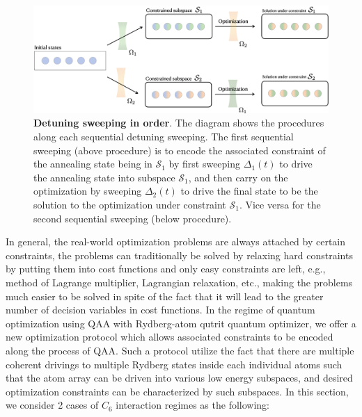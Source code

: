 \documentclass[%
 reprint,
nofootinbib,
 amsmath,amssymb,
 aps,
pra,
floatfix,
]{revtex4-2}
\begin{document}
\begin{figure}[b!]
    \centering
    \includegraphics[width=13cm]{picture/opti_procedure.png}
    \caption{\textbf{Detuning sweeping in order}.  The diagram shows the procedures along each sequential detuning sweeping. The first sequential sweeping (above procedure) is to encode the associated constraint of the annealing state being in $\mathcal{S}_1$ by first sweeping $\Delta_1(t)$ to drive the annealing state into subspace $\mathcal{S}_1$, and then carry on the optimization by sweeping $\Delta_2(t)$ to drive the final state to be the solution to the optimization under constraint $\mathcal{S}_1$. Vice versa for the second sequential sweeping (below procedure).}
    \label{fig:opt_procedure}
\end{figure}
In general, the real-world optimization problems are always attached by certain constraints, the problems can traditionally be solved by relaxing hard constraints by putting them into cost functions and only easy constraints are left, e.g., method of Lagrange multiplier, Lagrangian relaxation, etc., making the problems much easier to be solved in spite of the fact that it will lead to the greater number of decision variables in cost functions. In the regime of quantum optimization using QAA with Rydberg-atom qutrit quantum optimizer, we offer a new optimization protocol which allows associated constraints to be encoded along the process of QAA. Such a protocol utilize the fact that there are multiple coherent drivings to multiple Rydberg states inside each individual atoms such that the atom array can be driven into various low energy subspaces, and desired optimization constraints can be characterized by such subspaces. In this section, we consider 2 cases of $C_6$ interaction regimes as the following:
\end{document}

